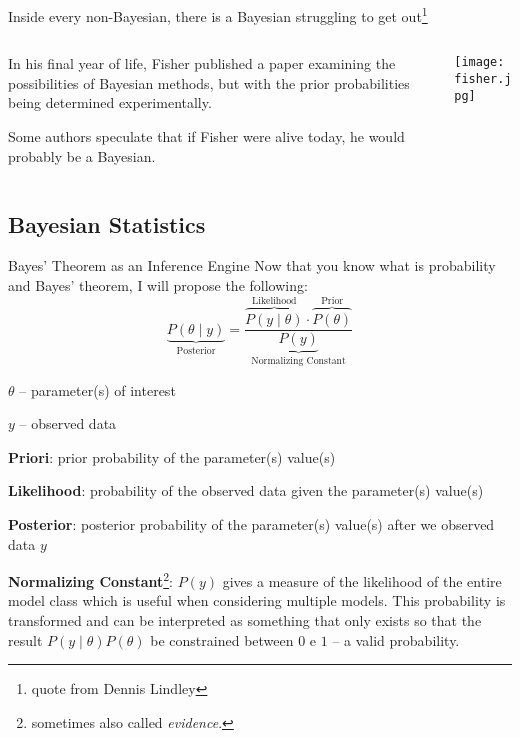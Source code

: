 \begin{frame}{Inside every non-Bayesian, there is a Bayesian struggling to get out\footnote{
			quote from Dennis Lindley}}
	\begin{columns}
		\begin{column}{0.8\textwidth}
			\begin{vfilleditems}
				\item In his final year of life,
				Fisher published a paper \parencite{fisherExamplesBayesMethod1962}
				examining the possibilities of Bayesian methods,
				but with the prior probabilities being determined experimentally.
				\item Some authors speculate \parencite{jaynesProbabilityTheoryLogic2003}
				that if Fisher were alive today, he would probably be a Bayesian.
			\end{vfilleditems}
		\end{column}
		\begin{column}{0.2\textwidth}
			\centering
			\texttt{[image: fisher.jpg]}
		\end{column}
	\end{columns}
\end{frame}

\subsection{Bayesian Statistics}
\begin{frame}{Bayes' Theorem as an Inference Engine}
	\footnotesize Now that you know what is probability and Bayes' theorem,
	I will propose the following:
	$$
		\underbrace{P(\theta \mid y)}_{\text{Posterior}} = \frac{\overbrace{P(y \mid  \theta)}^{\text{Likelihood}} \cdot \overbrace{P(\theta)}^{\text{Prior}}}{\underbrace{P(y)}_{\text{Normalizing Constant}}}
	$$
	\begin{vfilleditems}
		\item \footnotesize $\theta$ -- parameter(s) of interest
		\item \footnotesize $y$ -- observed data
		\item \footnotesize \textbf{Priori}: prior probability of the parameter(s) value(s)
		\item \footnotesize \textbf{Likelihood}: probability of the observed data given the parameter(s) value(s)
		\item \footnotesize \textbf{Posterior}: posterior probability of the parameter(s) value(s) after we observed data $y$
		\item \footnotesize \textbf{Normalizing Constant}\footnote{sometimes also called \textit{evidence}.}: $P(y)$ gives a measure of the likelihood of the entire model class which is useful when considering multiple models.
		This probability is transformed and can be interpreted as something that only exists so that the result $P(y \mid \theta) P(\theta)$ be constrained between $0$ e $1$ -- a valid probability.
	\end{vfilleditems}
\end{frame}

